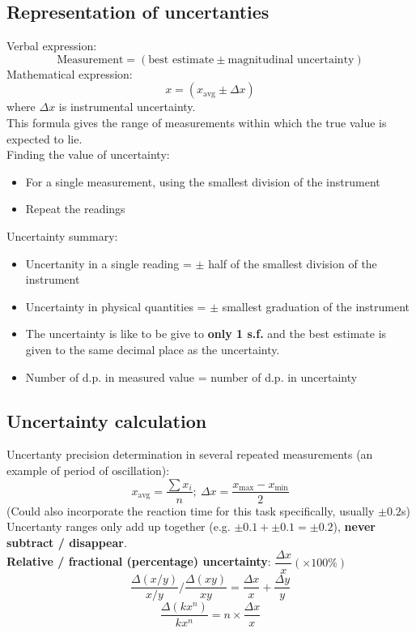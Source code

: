 \documentclass[a4paper,12pt]{article}
\begin{document}
\subsection{Representation of uncertanties}
Verbal expression:
\[\text{Measurement}=(\text{best estimate}\pm \text{magnitudinal uncertainty})\]
Mathematical expression:
\[x=(x_\text{avg} \pm \Delta x)\]
where $\Delta x$ is instrumental uncertainty. \\
This formula gives the range of measurements within which the true value is expected to lie.\\
Finding the value of uncertainty:
\begin{itemize}
  \item For a single measurement, using the smallest division of the instrument
  \item Repeat the readings
\end{itemize}
Uncertainty summary:
\begin{itemize}
  \item Uncertanity in a single reading = $\pm$ half of the smallest division of the instrument
  \item Uncertainty in physical quantities = $\pm$ smallest graduation of the instrument
  \item The uncertainty is like to be give to \textbf{only 1 s.f.} and the best estimate is given to the same decimal place as the uncertainty.
  \item Number of d.p. in measured value = number of d.p. in uncertainty
\end{itemize}
\subsection{Uncertainty calculation}
Uncertanty precision determination in several repeated measurements (an example of period of oscillation): 
\[x_\text{avg}=\dfrac{\sum{x_i}}{n};\ \Delta x=\dfrac{x_\text{max}-x_\text{min}}{2}\]
(Could also incorporate the reaction time for this task specifically, usually $\pm 0.2$s)\\
Uncertanty ranges only add up together (e.g. $\pm 0.1 + \pm 0.1 = \pm 0.2$), \textbf{never subtract / disappear}.\\
\textbf{Relative / fractional (percentage) uncertainty}: $\dfrac{\Delta x}{x} (\times 100\%)$\\
\[\dfrac{\Delta(x/y)}{x/y} \Big/ \dfrac{\Delta (xy)}{xy}=\dfrac{\Delta x}{x}+\dfrac{\Delta y}{y}\]
\[\dfrac{\Delta (kx^n)}{kx^n}=n\times \dfrac{\Delta x}{x}\]
\end{document}
